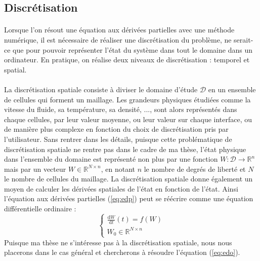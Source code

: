 	\subsection{Discrétisation}

		\paragraph{} Lorsque l'on résout une équation aux dérivées partielles avec une méthode numérique, il est nécessaire de réaliser une discrétisation du problème, ne serait-ce que pour pouvoir représenter l'état du système dans tout le domaine dans un ordinateur.
		En pratique, on réalise deux niveaux de discrétisation : temporel et spatial.

		\paragraph{} La discrétisation spatiale consiste à diviser le domaine d'étude $\mathcal{D}$ en un ensemble de cellules qui forment un maillage.
		Les grandeurs physiques étudiées comme la vitesse du fluide, sa température, sa densité, ..., sont alors représentés dans chaque cellules, par leur valeur moyenne, ou leur valeur sur chaque interface, ou de manière plus complexe en fonction du choix de discrétisation pris par l'utilisateur.
		Sans rentrer dans les détails, puisque cette problématique de discrétisation spatiale ne rentre pas dans le cadre de ma thèse, l'état physique dans l'ensemble du domaine est représenté non plus par une fonction $W : \mathcal{D} \rightarrow \mathbb{R}^n$ mais par un vecteur $W \in \mathbb{R}^{N\times n}$, en notant $n$ le nombre de degrés de liberté et $N$ le nombre de cellules du maillage.
		La discrétisation spatiale donne également un moyen de calculer les dérivées spatiales de l'état en fonction de l'état.
		Ainsi l'équation aux dérivées partielles (\ref{eq:edp}) peut se réécrire comme une équation différentielle ordinaire :
		\begin{equation}\label{eq:edo}
			\left\{\begin{aligned}
				\frac{\mathrm{d} W}{\mathrm{d} t}\left(t\right) = f\left(W\right) \\
				W_0 \in \mathbb{R}^{N\times n}
			\end{aligned}\right.
		\end{equation}
		Puisque ma thèse ne s'intéresse pas à la discrétisation spatiale, nous nous placerons dans le cas général et chercherons à résoudre l'équation (\ref{eq:edo}).


